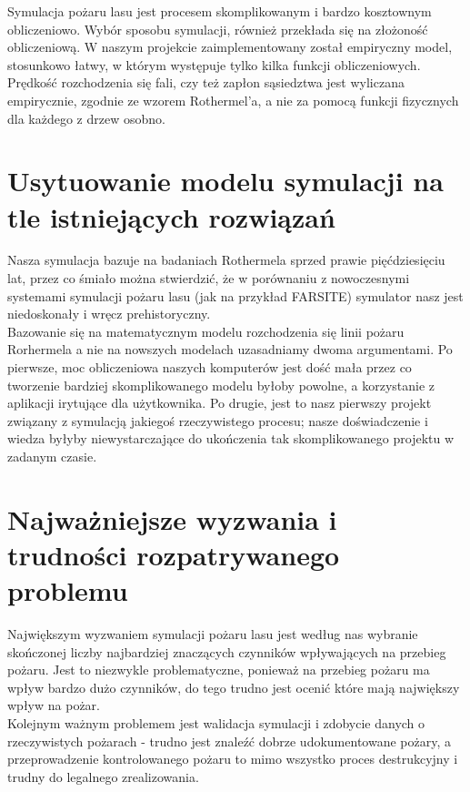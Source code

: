\documentclass[a4paper, 11pt]{article}
\begin{document}
		Symulacja pożaru lasu jest procesem skomplikowanym i bardzo kosztownym obliczeniowo. Wybór sposobu symulacji, również przekłada się na złożoność obliczeniową. W naszym projekcie zaimplementowany został empiryczny model, stosunkowo łatwy, w którym występuje tylko kilka funkcji obliczeniowych. Prędkość rozchodzenia się fali, czy też zapłon sąsiedztwa jest wyliczana empirycznie, zgodnie ze wzorem Rothermel'a, a nie za pomocą funkcji fizycznych dla każdego z drzew osobno.
	\section*{Usytuowanie modelu symulacji na tle istniejących rozwiązań}
	\indent
	
	Nasza symulacja bazuje na badaniach Rothermela sprzed prawie pięćdziesięciu lat, przez co śmiało można stwierdzić, że w porównaniu z nowoczesnymi systemami symulacji pożaru lasu (jak na przykład FARSITE) symulator nasz jest niedoskonały i wręcz prehistoryczny. \\
	
	Bazowanie się na matematycznym modelu rozchodzenia się linii pożaru Rorhermela a nie na nowszych modelach uzasadniamy dwoma argumentami. Po pierwsze, moc obliczeniowa naszych komputerów jest dość mała przez co tworzenie bardziej skomplikowanego modelu byłoby powolne, a korzystanie z aplikacji irytujące dla użytkownika. Po drugie, jest to nasz pierwszy projekt związany z symulacją jakiegoś rzeczywistego procesu; nasze doświadczenie i wiedza byłyby niewystarczające do ukończenia tak skomplikowanego projektu w zadanym czasie.
	\section*{Najważniejsze wyzwania i trudności rozpatrywanego problemu}
	\indent
	
	Największym wyzwaniem symulacji pożaru lasu jest według nas wybranie skończonej liczby najbardziej znaczących czynników wpływających na przebieg pożaru. Jest to niezwykle problematyczne, ponieważ na przebieg pożaru ma wpływ bardzo dużo czynników, do tego trudno jest ocenić które mają największy wpływ na pożar. \\
	
	Kolejnym ważnym problemem jest walidacja symulacji i zdobycie danych o rzeczywistych pożarach - trudno jest znaleźć dobrze udokumentowane pożary, a przeprowadzenie kontrolowanego pożaru to mimo wszystko proces destrukcyjny i trudny do legalnego zrealizowania.
\end{document}
